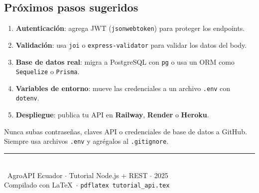 \documentclass[12pt, a4paper]{article}
\begin{document}
\subsection{Próximos pasos sugeridos}

\begin{enumerate}[leftmargin=*, label=\textbf{\arabic*.}]
  \item \textbf{Autenticación}: agrega JWT (\texttt{jsonwebtoken}) para proteger los endpoints.
  \item \textbf{Validación}: usa \texttt{joi} o \texttt{express-validator} para validar los datos del body.
  \item \textbf{Base de datos real}: migra a PostgreSQL con \texttt{pg} o usa un ORM como \texttt{Sequelize} o \texttt{Prisma}.
  \item \textbf{Variables de entorno}: mueve las credenciales a un archivo \texttt{.env} con \texttt{dotenv}.
  \item \textbf{Despliegue}: publica tu API en \textbf{Railway}, \textbf{Render} o \textbf{Heroku}.
\end{enumerate}

\begin{tcolorbox}[peligroStyle]
  Nunca subas contraseñas, claves API o credenciales de base de datos a GitHub. Siempre usa archivos \texttt{.env} y agrégalos al \texttt{.gitignore}.
\end{tcolorbox}

\vfill
\begin{center}
  \color{grisMedio}
  \rule{10cm}{0.4pt}\\[0.5em]
  {\small \faLeaf\ AgroAPI Ecuador $\cdot$ Tutorial Node.js + REST $\cdot$ 2025}\\
  {\small Compilado con \LaTeX\ $\cdot$ \texttt{pdflatex tutorial\_api.tex}}
\end{center}
\end{document}
